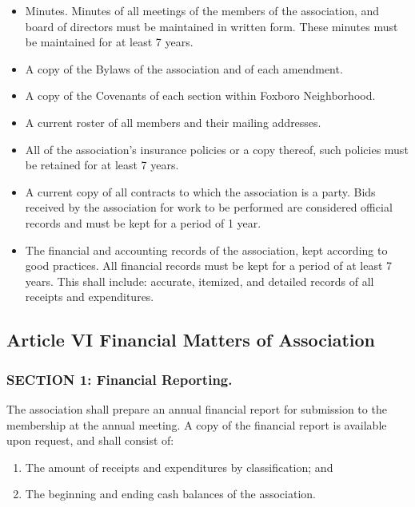 \begin{itemize}

\item Minutes. Minutes of all meetings of the members of the association,
and board of directors must be maintained in written form. These minutes
must be maintained for at least 7 years.

\item A copy of the Bylaws of the association and of each amendment.

\item A copy of the Covenants of each section within Foxboro Neighborhood.

\item A current roster of all members and their mailing addresses.

\item All of the association’s insurance policies or a copy thereof,
such policies must be retained for at least 7 years.

\item A current copy of all contracts to which the association is a
party. Bids received by the association for work to be performed are
considered official records and must be kept for a period of 1 year.

\item The financial and accounting records of the association, kept
according to good practices. All financial records must be kept for
a period of at least 7 years. This shall include: accurate, itemized,
and detailed records of all receipts and expenditures.

\end{itemize}

\subsection{Article VI Financial Matters of Association}

\subsubsection{SECTION 1: Financial Reporting.}
The association shall prepare an annual financial report for submission
to the membership at the annual meeting. A copy of the financial report
is available upon request, and shall consist of:

\begin{enumerate}[label=\alph*)]
\item The amount of receipts and expenditures by classification; and
\item The beginning and ending cash balances of the association.
\end{enumerate}

